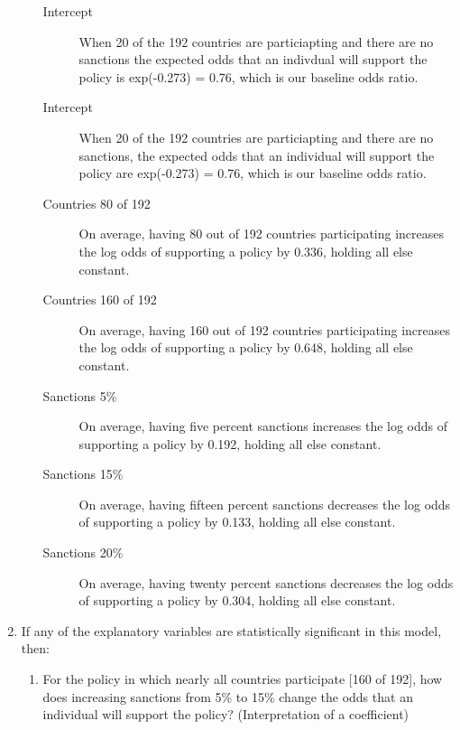 \documentclass[12pt,letterpaper]{article}
\begin{document}
\begin{enumerate}
\begin{enumerate}
\begin{description}
	\item[Intercept] When 20 of the 192 countries are particiapting and there are no sanctions the expected odds that an indivdual will support the policy is exp(-0.273) = 0.76, which is our baseline odds ratio. 
	\item[Intercept] When 20 of the 192 countries are particiapting and there are no sanctions, the expected odds that an individual will support the policy are exp(-0.273) = 0.76, which is our baseline odds ratio. 
\item[Countries 80 of 192] On average, having 80 out of 192 countries participating increases the log odds of supporting a policy by 0.336, holding all else constant.
\item[Countries 160 of 192] On average, having 160 out of 192 countries participating increases the log odds of supporting a policy by 0.648, holding all else constant.
\item[Sanctions 5\%] On average, having five percent sanctions increases the log odds of supporting a policy by 0.192, holding all else constant.
\item[Sanctions 15\%] On average, having fifteen percent sanctions decreases the log odds of supporting a policy by 0.133, holding all else constant.
\item[Sanctions 20\%] On average, having twenty percent sanctions decreases the log odds of supporting a policy by 0.304, holding all else constant.

\end{description}
	
		\vspace{2cm}
\end{enumerate}

	

	
	\item
	If any of the explanatory variables are statistically significant in this model, then:
	\begin{enumerate}
		\item
		For the policy in which nearly all countries participate [160 of 192], how does increasing sanctions from 5\% to 15\% change the odds that an individual will support the policy? (Interpretation of a coefficient)
		

\end{enumerate}
\end{enumerate}
\end{document}
